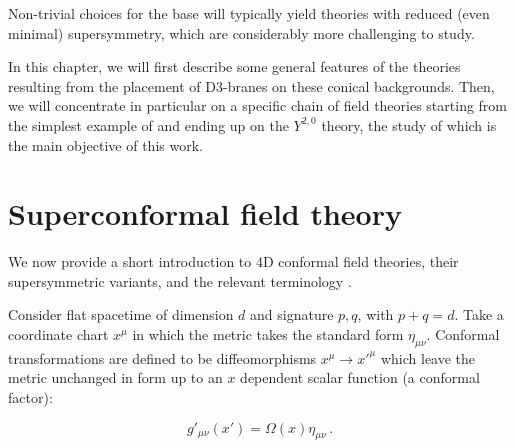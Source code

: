 Non-trivial choices for the base will typically yield theories with reduced (even minimal) supersymmetry, which are considerably more challenging to study.

In this chapter, we will first describe some general features of the theories resulting from the placement of D3-branes on these conical backgrounds. Then, we will concentrate in particular on a specific chain of field theories starting from the simplest example of \SYM and ending up on the $Y^{2,0}$ theory, the study of which is the main objective of this work.

\section{Superconformal field theory}\label{sec:scft}

We now provide a short introduction to 4D conformal field theories, their supersymmetric variants, and the relevant terminology \cite{lezionilosanna}.

%
%
%

Consider flat spacetime of dimension $d$ and signature $p,q$, with $p+q = d$. Take a coordinate chart $x^\mu$ in which the metric takes the standard form $\eta_{\mu\nu}$. Conformal transformations are defined to be diffeomorphisms $x^\mu \rightarrow x'^\mu$ which leave the metric unchanged in form up to an $x$ dependent scalar function (a conformal factor):

\begin{equation}
	g'_{\mu\nu}(x') = \Omega(x) \eta_{\mu\nu}\,.
	\label{}
\end{equation}



